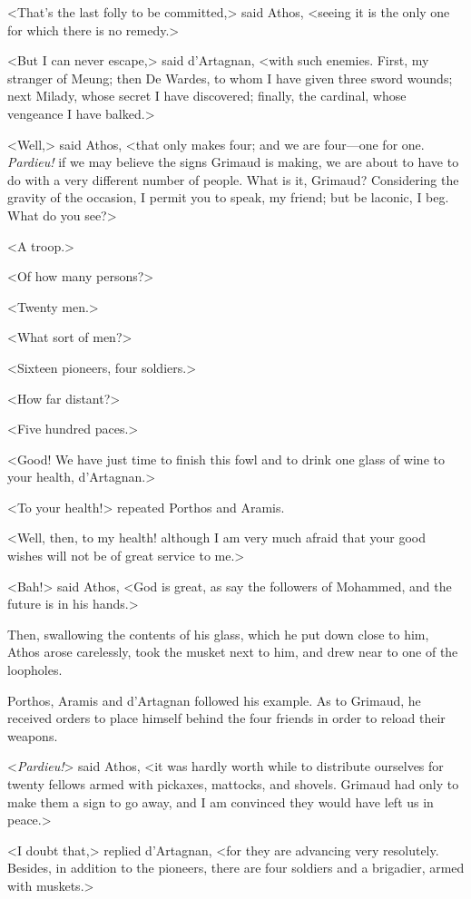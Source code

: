 <That's the last folly to be committed,> said Athos, <seeing it is the only one for which there is no remedy.> 

<But I can never escape,> said d'Artagnan, <with such enemies. First, my stranger of Meung; then De Wardes, to whom I have given three sword wounds; next Milady, whose secret I have discovered; finally, the cardinal, whose vengeance I have balked.> 

<Well,> said Athos, <that only makes four; and we are four---one for one. \textit{Pardieu!} if we may believe the signs Grimaud is making, we are about to have to do with a very different number of people. What is it, Grimaud? Considering the gravity of the occasion, I permit you to speak, my friend; but be laconic, I beg. What do you see?> 

<A troop.> 

<Of how many persons?> 

<Twenty men.> 

<What sort of men?> 

<Sixteen pioneers, four soldiers.> 

<How far distant?> 

<Five hundred paces.> 

<Good! We have just time to finish this fowl and to drink one glass of wine to your health, d'Artagnan.> 

<To your health!> repeated Porthos and Aramis. 

<Well, then, to my health! although I am very much afraid that your good wishes will not be of great service to me.> 

<Bah!> said Athos, <God is great, as say the followers of Mohammed, and the future is in his hands.> 

Then, swallowing the contents of his glass, which he put down close to him, Athos arose carelessly, took the musket next to him, and drew near to one of the loopholes. 

Porthos, Aramis and d'Artagnan followed his example. As to Grimaud, he received orders to place himself behind the four friends in order to reload their weapons. 

<\textit{Pardieu!}> said Athos, <it was hardly worth while to distribute ourselves for twenty fellows armed with pickaxes, mattocks, and shovels. Grimaud had only to make them a sign to go away, and I am convinced they would have left us in peace.> 

<I doubt that,> replied d'Artagnan, <for they are advancing very resolutely. Besides, in addition to the pioneers, there are four soldiers and a brigadier, armed with muskets.> 

